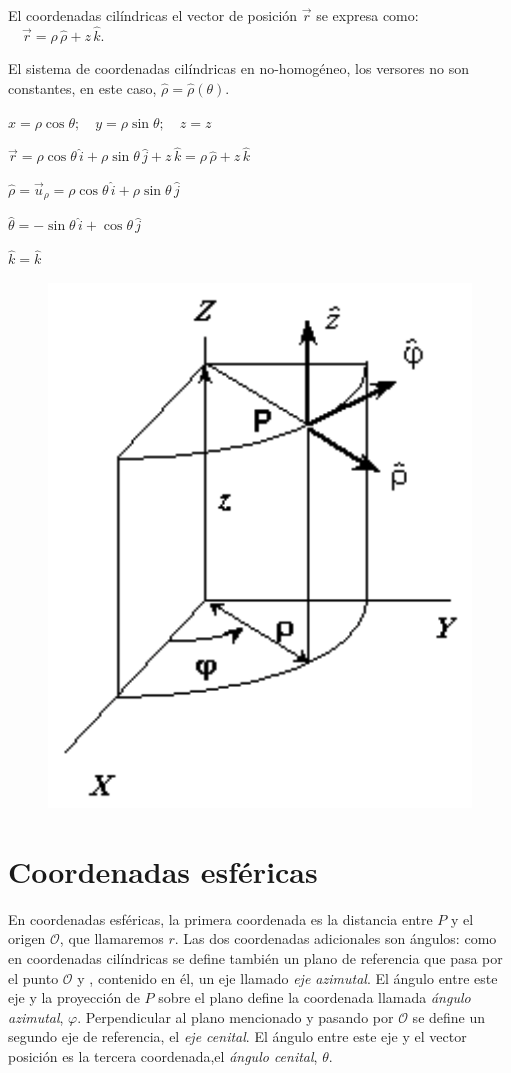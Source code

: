 El coordenadas cilíndricas el vector de posición $\vec r$  se expresa como: $\quad \vec r=\rho\, \widehat \rho+z\, \widehat k$.

El sistema de coordenadas cilíndricas en no-homogéneo, los versores no son constantes, en este caso, $\widehat \rho=\widehat \rho(\theta)$.


\begin{multicols}{2}


$x= \rho \cos \theta;\quad y=\rho \sin \theta;\quad z=z$

$\vec r=\rho \cos \theta \, \widehat i+\rho \sin \theta \, \widehat j+z \, \widehat k=\rho \, \widehat \rho+z \, \widehat k$

$\widehat \rho= \vec u_\rho=\rho \cos \theta \, \widehat i+\rho \sin \theta \, \widehat j$

$\widehat \theta=-\sin \theta \, \widehat i+\cos \theta \, \widehat j$

$\widehat k=\widehat k$

\begin{figure}[H]
	\centering
	\includegraphics[width=.25\textwidth]{img-coordenadas/coordenadas-11.png}
	\end{figure}
	
\end{multicols}

\vspace{1cm}
\section{Coordenadas esféricas}

\vspace{0.5cm}


En coordenadas esféricas, la primera coordenada es la distancia entre $P$ y el origen $\mathcal O$, que llamaremos $r$. Las dos coordenadas adicionales son  ángulos: como en coordenadas cilíndricas se define también un plano de  referencia que pasa por el punto $\mathcal O$ y , contenido en él, un eje llamado \emph{eje azimutal}. El ángulo entre este eje y la proyección de $P$ sobre el plano define la coordenada llamada \emph{ángulo azimutal}, $\varphi$. Perpendicular al plano mencionado y pasando por $\mathcal O$ se define un segundo eje de referencia, el \emph{eje cenital}. El ángulo entre este eje y el vector posición es la tercera coordenada,el \emph{ángulo cenital}, $\theta$. 


